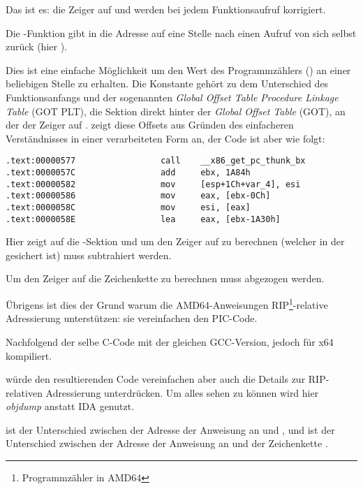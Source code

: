 Das ist es: die Zeiger auf \retstring{} und \globvar{} werden bei jedem Funktionsaufruf korrigiert.

\par Die -Funktion gibt in \EBX die Adresse auf eine Stelle nach einen
Aufruf von sich selbst zurück (hier ).

Dies ist eine einfache Möglichkeit um den Wert des Programmzählers (\EIP) an einer beliebigen Stelle zu erhalten.
Die Konstante  gehört zu dem Unterschied des Funktionsanfangs und der sogenannten
\emph{Global Offset Table Procedure Linkage Table} (GOT PLT), die Sektion direkt hinter der \emph{Global Offset Table}
(GOT), an der der Zeiger auf \globvar{}.
\IDA zeigt diese Offsets aus Gründen des einfacheren Verständnisses in einer verarbeiteten Form an,
der Code ist aber wie folgt:

\begin{lstlisting}
.text:00000577                 call    __x86_get_pc_thunk_bx
.text:0000057C                 add     ebx, 1A84h
.text:00000582                 mov     [esp+1Ch+var_4], esi
.text:00000586                 mov     eax, [ebx-0Ch]
.text:0000058C                 mov     esi, [eax]
.text:0000058E                 lea     eax, [ebx-1A30h]
\end{lstlisting}

Hier zeigt \EBX auf die -Sektion und um den Zeiger auf \globvar{} zu berechnen
(welcher in der  gesichert ist) muss  subtrahiert werden.

Um den Zeiger auf die Zeichenkette \retstring{} zu berechnen muss  abgezogen werden.


Übrigens ist dies der Grund warum die AMD64-Anweisungen RIP\footnote{Programmzähler in AMD64}-relative Adressierung
unterstützen: sie vereinfachen den PIC-Code.

Nachfolgend der selbe C-Code mit der gleichen GCC-Version, jedoch für x64 kompiliert.

\IDA würde den resultierenden Code vereinfachen aber auch die Details zur RIP-relativen Adressierung
unterdrücken. Um alles sehen zu können wird hier \emph{objdump} anstatt IDA genutzt.



 ist der Unterschied zwischen der Adresse der Anweisung an  und \globvar{},
und  ist der Unterschied zwischen der Adresse der Anweisung an  und der
Zeichenkette \retstring{}.

